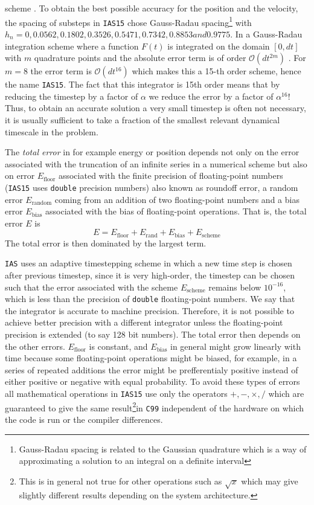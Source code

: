 \documentclass[ twoside,openright,titlepage,numbers=noenddot,headinclude,%
                footinclude=true,cleardoublepage=empty,abstractoff, %
                BCOR=5mm,paper=a4,fontsize=11pt,%
                american,%
                ]{scrreprt}
\begin{document}
scheme
\citep[see][for details]{Rein2014}. To obtain the best possible accuracy for
the position and the velocity, the spacing of substeps in \texttt{IAS15} 
\cite{Rein2014} chose Gauss-Radau spacing\footnote{Gauss-Radau spacing is related to 
the Gaussian quadrature which is a way of approximating a solution to an 
integral on a definite interval} with $h_n=0, 0.0562, 0.1802, 0.3526, 
0.5471, 0.7342, 0.8853 and 0.9775$. In a Gauss-Radau integration scheme
where a function $F(t)$ is integrated on the domain $[0,dt]$ with $m$ quadrature
points and the absolute error term is of order $\mathcal{O}(dt^{2m})$
\cite{Rein2014}. 
For $m=8$ the error term is $\mathcal{O}(dt^{16})$ which makes this
a 15-th order scheme, hence the name \texttt{IAS15}. The fact that this
integrator is 15th order means that by reducing the timestep by a factor of
$\alpha$ we reduce the error by a factor of $\alpha^{16}$! Thus, to obtain
an accurate solution a very small timestep is often not necessary, it is
usually sufficient to take a fraction of the smallest relevant dynamical
timescale in the problem.

The \emph{total error} in for example energy or position 
depends not only on the error associated
with the truncation of an infinite series in a numerical scheme but also
on error $E_\text{floor}$ associated with the finite precision of 
floating-point numbers 
(\texttt{IAS15} uses \texttt{double} precision numbers) also known as
roundoff error, a random error 
$E_\text{random}$ coming from an addition of two floating-point numbers 
and a bias error $E_\text{bias}$ associated
with the bias of floating-point operations. That is, the total error $E$ is
\begin{equation}
    E=E_\text{floor}+E_\text{rand}+E_\text{bias}+E_\text{scheme}
\end{equation}
The total error is then dominated by the largest term. 

\texttt{IAS} uses an adaptive timestepping scheme in which a new time
step is chosen after previous timestep, since it is very high-order, the 
timestep can be chosen such that the error associated with the scheme
$E_\text{scheme}$ remains below $10^{-16}$, which is less than the precision
of \texttt{double} floating-point numbers. We say that the integrator is
accurate to machine precision. Therefore, it is not possible to achieve
better precision with a different integrator unless the floating-point 
precision is extended (to say 128 bit numbers). 
The total error then depends on the other errors. $E_\text{floor}$ is constant,
and $E_\text{bias}$ in general might grow linearly with time because
some floating-point operations might be biased, for example, in a series
of repeated additions the error might be prefferentialy positive instead of
either positive or negative with equal probability. To avoid these types of
errors all mathematical operations in \texttt{IAS15} use only the operators
$+,-,\times,/$ which are guaranteed to give the same result\footnote{This is 
in general not true for other operations such as $\sqrt{x}$ which may give 
slightly different results depending on the system architecture.}in \texttt{C99}
independent of the hardware on which the code is run or the compiler differences.
\end{document}
